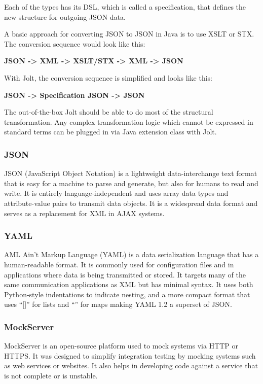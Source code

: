Each of the types has its DSL, which is called a specification, that defines the new structure for outgoing JSON data.

A basic approach for converting JSON to JSON in Java is to use XSLT or STX. The conversion sequence would look like this:
\begin{center}
\textbf{JSON -> XML -> XSLT/STX -> XML -> JSON}
\end{center}

With Jolt, the conversion sequence is simplified and looks like this:
\begin{center}
\textbf{JSON -> Specification JSON -> JSON}
\end{center}

The out-of-the-box Jolt should be able to do most of the structural transformation. Any complex transformation logic which cannot be expressed in standard terms can be plugged in via Java extension class with Jolt.~\cite{jolt}

\subsubsection{JSON}
JSON (JavaScript Object Notation) is a lightweight data-interchange text format that is easy for a machine to parse and generate, but also for humans to read and write. It is entirely language-independent and uses array data types and attribute-value pairs to transmit data objects. It is a widespread data format and serves as a replacement for XML in AJAX systems.~\cite{json}

\subsubsection{YAML}
AML Ain't Markup Language (YAML) is a data serialization language that has a human-readable format. It is commonly used for configuration files and in applications where data is being transmitted or stored. It targets many of the same communication applications as XML but has minimal syntax. It uses both Python-style indentations to indicate nesting, and a more compact format that uses ``[]'' for lists and ``{}'' for maps making YAML 1.2 a superset of JSON.~\cite{yaml}

\subsubsection{MockServer}
MockServer is an open-source platform used to mock systems via HTTP or HTTPS. It was designed to simplify integration testing by mocking systems such as web services or websites. It also helps in developing code against a service that is not complete or is unstable.~\cite{mockserver}

